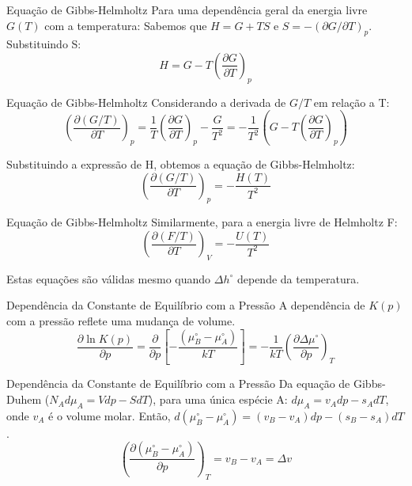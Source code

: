 \documentclass{beamer}
\begin{document}
\begin{frame}{Equação de Gibbs-Helmholtz}
    Para uma dependência geral da energia livre $G(T)$ com a temperatura:
    Sabemos que $H = G + TS$ e $S = -(\partial G/\partial T)_p$.
    Substituindo S:
    $$ H = G - T\left(\frac{\partial G}{\partial T}\right)_p $$
     
\end{frame}

\begin{frame}{Equação de Gibbs-Helmholtz}
    Considerando a derivada de $G/T$ em relação a T:
    $$ \left(\frac{\partial (G/T)}{\partial T}\right)_p = \frac{1}{T}\left(\frac{\partial G}{\partial T}\right)_p - \frac{G}{T^2} = -\frac{1}{T^2}\left(G - T\left(\frac{\partial G}{\partial T}\right)_p\right) $$
     
    Substituindo a expressão de H, obtemos a equação de Gibbs-Helmholtz:
    $$ \left(\frac{\partial (G/T)}{\partial T}\right)_p = -\frac{H(T)}{T^2} $$
    
\end{frame}

\begin{frame}{Equação de Gibbs-Helmholtz}
    Similarmente, para a energia livre de Helmholtz F:
    $$ \left(\frac{\partial (F/T)}{\partial T}\right)_V = -\frac{U(T)}{T^2} $$
    
    Estas equações são válidas mesmo quando $\Delta h^{\circ}$ depende da temperatura.
\end{frame}

\begin{frame}{Dependência da Constante de Equilíbrio com a Pressão}
    A dependência de $K(p)$ com a pressão reflete uma mudança de volume.
    $$ \frac{\partial \ln K(p)}{\partial p} = \frac{\partial}{\partial p}\left[-\frac{(\mu_B^{\circ} - \mu_A^{\circ})}{kT}\right] = -\frac{1}{kT}\left(\frac{\partial \Delta\mu^{\circ}}{\partial p}\right)_T $$
     
\end{frame}

\begin{frame}{Dependência da Constante de Equilíbrio com a Pressão}
    Da equação de Gibbs-Duhem ($N_A d\mu_A = Vdp - SdT$), para uma única espécie A: $d\mu_A = v_A dp - s_A dT$, onde $v_A$ é o volume molar.
    Então, $d(\mu_B^{\circ} - \mu_A^{\circ}) = (v_B - v_A)dp - (s_B - s_A)dT$.
    $$ \left(\frac{\partial(\mu_B^{\circ} - \mu_A^{\circ})}{\partial p}\right)_T = v_B - v_A = \Delta v $$
     
\end{frame}
\end{document}
